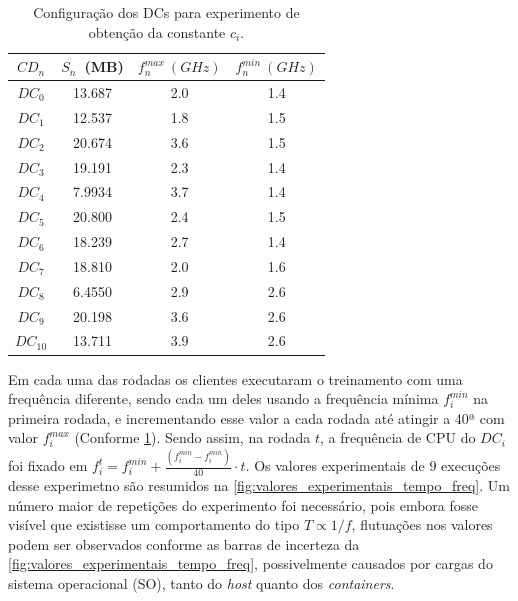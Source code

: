 \begin{table}[H]
        \centering
        \begin{tabular}{c|c|c|c}
            $CD_n$   & $S_n$\ (MB) & $f_n^{max}\ (GHz)$ & $f_n^{min}\ (GHz)$\\
             \hline
            $ DC_0  $ &  13.687    &       2.0    &  1.4         \\
            $ DC_1$   &  12.537    &       1.8    &  1.5         \\
            $ DC_2$   &  20.674    &       3.6    &  1.5         \\
            $ DC_3 $  &  19.191	 &       2.3    &  1.4         \\
            $ DC_4  $ &  7.9934    &       3.7    &  1.4         \\
            $ DC_5 $  &  20.800    &       2.4    &  1.5         \\
            $ DC_6 $  &  18.239    &       2.7    &  1.4         \\
            $ DC_7 $   &  18.810    &       2.0    &  1.6         \\
            $ DC_8  $ &  6.4550    &       2.9    &  2.6         \\
            $ DC_9 $   &  20.198    &       3.6    &  2.6         \\
            $ DC_{10}$  &  13.711    &       3.9    &  2.6          \\
            \hline
        \end{tabular}
        \caption{Configuração dos DCs para experimento de obtenção da constante $c_i$.}
        \label{tab:sta_config_pre_fit}
    \end{table}

Em cada uma das rodadas os clientes executaram o treinamento com uma frequência diferente, sendo cada um deles usando a frequência mínima $f^{min}_i$ na primeira rodada, e incrementando esse valor a cada rodada até atingir a 40ª com valor $f_i^{max}$ (Conforme \cref{tab:sta_config_pre_fit}). Sendo assim, na rodada $t$, a frequência de CPU do $ DC_i$ foi fixado em $f_i^t=f_i^{min}+\frac{(f_i^{min}-f_i^{min})}{40}\cdot t$. Os valores experimentais de 9 execuções desse experimetno são resumidos na \cref{fig:valores_experimentais_tempo_freq}. Um número maior de repetições do experimento foi necessário, pois embora fosse visível que existisse um comportamento do tipo $T\propto 1/f$, flutuações nos valores podem ser observados conforme as barras de incerteza da \cref{fig:valores_experimentais_tempo_freq}, possivelmente causados por cargas do sistema operacional (SO), tanto do \textit{host} quanto dos \textit{containers}.

